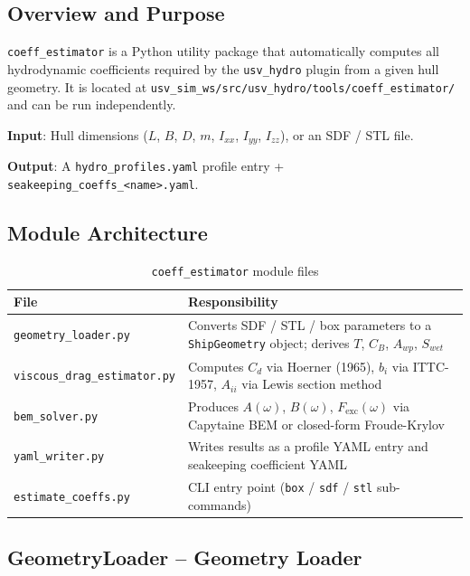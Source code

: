 \documentclass[12pt,a4paper]{article}
\begin{document}
\subsection{Overview and Purpose}

\texttt{coeff\_estimator} is a Python utility package that automatically
computes all hydrodynamic coefficients required by the \texttt{usv\_hydro}
plugin from a given hull geometry.
It is located at
\texttt{usv\_sim\_ws/src/usv\_hydro/tools/coeff\_estimator/}
and can be run independently.

\textbf{Input}: Hull dimensions ($L$, $B$, $D$, $m$, $I_{xx}$, $I_{yy}$,
$I_{zz}$), or an SDF / STL file.

\textbf{Output}: A \texttt{hydro\_profiles.yaml} profile entry +
\texttt{seakeeping\_coeffs\_<name>.yaml}.

\subsection{Module Architecture}

\begin{table}[H]
  \centering
  \caption{\texttt{coeff\_estimator} module files}
  \begin{tabularx}{\linewidth}{lX}
    \toprule
    \textbf{File} & \textbf{Responsibility} \\
    \midrule
    \texttt{geometry\_loader.py}        & Converts SDF / STL / box parameters to a \texttt{ShipGeometry} object; derives $T$, $C_B$, $A_{wp}$, $S_{wet}$ \\
    \texttt{viscous\_drag\_estimator.py} & Computes $C_d$ via Hoerner (1965), $b_i$ via ITTC-1957, $A_{ii}$ via Lewis section method \\
    \texttt{bem\_solver.py}             & Produces $A(\omega)$, $B(\omega)$, $F_{\text{exc}}(\omega)$ via Capytaine BEM or closed-form Froude-Krylov \\
    \texttt{yaml\_writer.py}            & Writes results as a profile YAML entry and seakeeping coefficient YAML \\
    \texttt{estimate\_coeffs.py}        & CLI entry point (\texttt{box} / \texttt{sdf} / \texttt{stl} sub-commands) \\
    \bottomrule
  \end{tabularx}
\end{table}

\subsection{GeometryLoader -- Geometry Loader}
\end{document}

